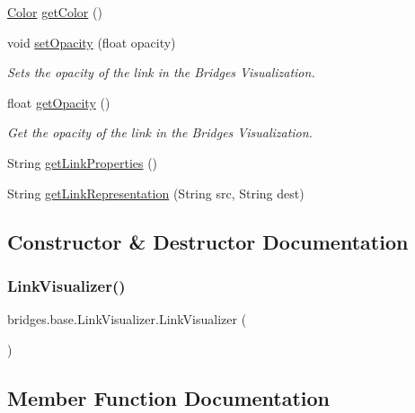 \begin{DoxyCompactItemize}
\hyperlink{classbridges_1_1base_1_1_color}{Color} \hyperlink{classbridges_1_1base_1_1_link_visualizer_a3ed52d98ecab99c6d8dd136fba913b7d}{get\+Color} ()
\item 
void \hyperlink{classbridges_1_1base_1_1_link_visualizer_ac0d59614dbc65ed0a19c25c493a1deaa}{set\+Opacity} (float opacity)
\begin{DoxyCompactList}\small\item\em Sets the opacity of the link in the Bridges Visualization. \end{DoxyCompactList}\item 
float \hyperlink{classbridges_1_1base_1_1_link_visualizer_a07cdd435a54e4b612ad63614f2a27a4a}{get\+Opacity} ()
\begin{DoxyCompactList}\small\item\em Get the opacity of the link in the Bridges Visualization. \end{DoxyCompactList}\item 
String \hyperlink{classbridges_1_1base_1_1_link_visualizer_ab64d9b7e2b99f7ebce80cbabfe4adf2a}{get\+Link\+Properties} ()
\item 
String \hyperlink{classbridges_1_1base_1_1_link_visualizer_af0a196babb49f49be7d8ce88f6b2f8db}{get\+Link\+Representation} (String src, String dest)
\end{DoxyCompactItemize}


\subsection{Constructor \& Destructor Documentation}
\mbox{\label{classbridges_1_1base_1_1_link_visualizer_a0b69f099fa264ae9097b0efe278c6a1b}} 
\subsubsection{\texorpdfstring{Link\+Visualizer()}{LinkVisualizer()}}
{\footnotesize\ttfamily bridges.\+base.\+Link\+Visualizer.\+Link\+Visualizer (\begin{DoxyParamCaption}{ }\end{DoxyParamCaption})}



\subsection{Member Function Documentation}
\mbox{\label{classbridges_1_1base_1_1_link_visualizer_a3ed52d98ecab99c6d8dd136fba913b7d}} 
